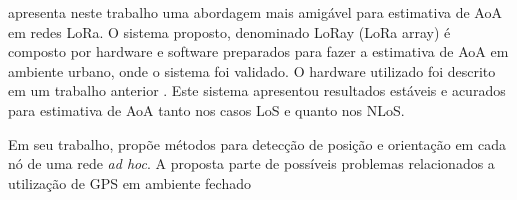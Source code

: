 \citeauthor{bnilam2020lora} \cite{bnilam2020lora} apresenta neste trabalho uma abordagem mais amigável para estimativa de \ac{AoA} em redes \ac{LoRa}.
O sistema proposto, denominado LoRay (\ac{LoRa} array) é composto por hardware e software preparados para fazer a estimativa de \ac{AoA} em ambiente urbano, onde o sistema foi validado.
O hardware utilizado foi descrito em um trabalho anterior \cite{bnilam2019low}.
Este sistema apresentou resultados estáveis e acurados para estimativa de \ac{AoA} tanto nos casos \ac{LoS} e quanto nos \ac{NLoS}.



Em seu trabalho, \citeauthor{niculescu2003ad} \cite{niculescu2003ad} propõe métodos para detecção de posição e orientação em cada nó de uma rede \textit{ad hoc}.
A proposta parte de possíveis problemas relacionados a utilização de \ac{GPS} em ambiente fechado

